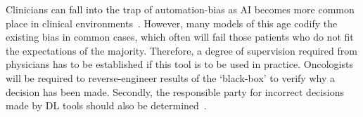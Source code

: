 \documentclass[12pt,twoside]{report}
\begin{document}
Clinicians can fall into the trap of automation-bias as AI becomes more common place in clinical environments~\cite{STRAW2020101965}. However, many models of this age codify the existing bias in common cases, which often will fail those patients who do not fit the expectations of the majority. Therefore, a degree of supervision required from physicians has to be established if this tool is to be used in practice. Oncologists will be required to reverse-engineer results of the `black-box' to verify why a decision has been made. Secondly, the responsible party for incorrect decisions made by DL tools should also be determined~\cite{Chen2021-dg}.



\end{document}
